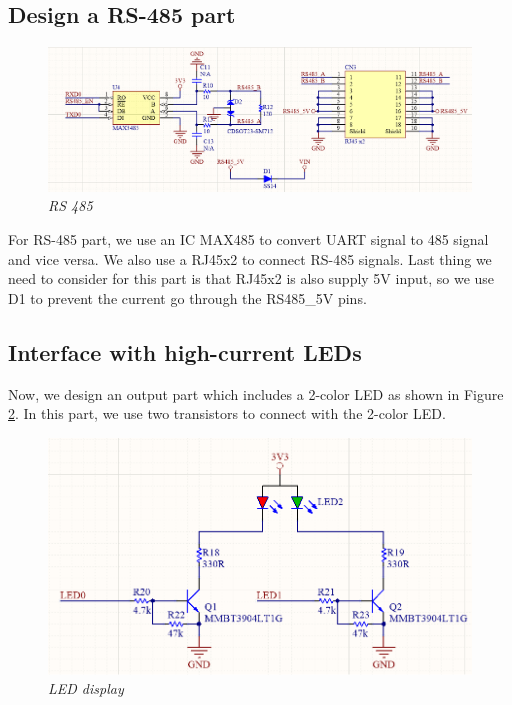 \newpage
\subsection{Design a RS-485 part}
\begin{figure}[!htp]
    \centering
    \includegraphics[width=6in]{source/picture/bai_7/bai7_rs485.png}
    \caption{\textit{RS 485}}
    \label{bai7_rs485}
\end{figure}
For RS-485 part, we use an IC MAX485 to convert UART signal to 485 signal and vice versa. We also use a RJ45x2 to connect RS-485 signals. Last thing we need to consider for this part is that RJ45x2 is also supply 5V input, so we use D1 to prevent the current go through the RS485\_5V pins. 

\newpage
\subsection{Interface with high-current LEDs}
Now, we design an output part which includes a 2-color LED as shown in Figure \ref{bai7_LEDs}. In this part, we use two transistors to connect with the 2-color LED.
\begin{figure}[!htp]
    \centering
    \includegraphics[width=5in]{source/picture/bai_7/bai7_LEDs.png}
    \caption{\textit{LED display}}
    \label{bai7_LEDs}
\end{figure}


